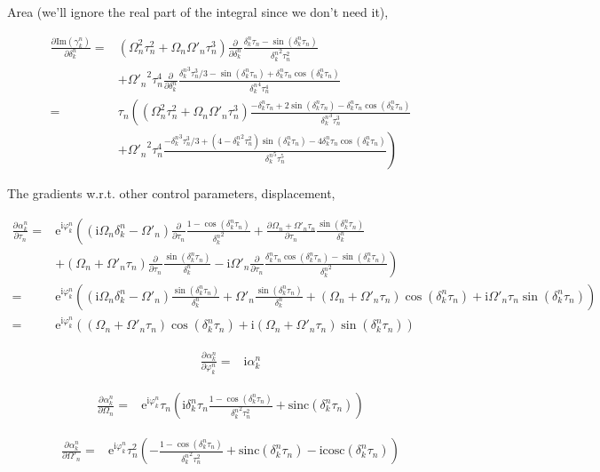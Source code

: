 \documentclass[10pt,fleqn]{article}
\newcommand{\ue}{\mathrm{e}}
\newcommand{\ui}{\mathrm{i}}
\newcommand{\eqar}[1]
{
  \begin{align*}
    #1
  \end{align*}
}
\newcommand{\paren}[1]{{\left({#1}\right)}}
\newcommand{\lparen}[1]{{\left({#1}\right.}}
\newcommand{\rparen}[1]{{\left.{#1}\right)}}
\newcommand{\pdiff}[3][{}]{{\frac{\partial^{#1} {#2}}{\partial {#3}{}^{#1}}}}
\begin{document}
Area (we'll ignore the real part of the integral since we don't need it),
\eqar{
  \pdiff{\mathrm{Im}\paren{\gamma_k^n}}{\delta_k^n}=&
  \paren{\Omega_n^2\tau_n^2+\Omega_n\Omega'_n\tau_n^3}\pdiff{}{\delta_k^n}\frac{\delta_k^n\tau_n-\sin\paren{{\delta_k^n}\tau_n}}{{\delta_k^n}^2\tau_n^2}\\
  &+{\Omega'_n}^2\tau_n^4\pdiff{}{\delta_k^n}\frac{
    {\delta_k^n}^3\tau_n^3/3
    -\sin\paren{{\delta_k^n}\tau_n}
    +{\delta_k^n}\tau_n\cos\paren{{\delta_k^n}\tau_n}
  }{{\delta_k^n}^4\tau_n^4}\\
  =&\tau_n\lparen{
    \paren{\Omega_n^2\tau_n^2+\Omega_n\Omega'_n\tau_n^3}
    \frac{-\delta_k^n\tau_n+2\sin\paren{{\delta_k^n}\tau_n}-{\delta_k^n}\tau_n\cos\paren{{\delta_k^n}\tau_n}}{{\delta_k^n}^3\tau_n^3}
  }\\
  &\rparen{+{\Omega'_n}^2\tau_n^4\frac{
      -{\delta_k^n}^3\tau_n^3/3
      +\paren{4-{\delta_k^n}^2\tau_n^2}\sin\paren{{\delta_k^n}\tau_n}
      -4{\delta_k^n}\tau_n\cos\paren{{\delta_k^n}\tau_n}
    }{{\delta_k^n}^5\tau_n^5}
  }
}

The gradients w.r.t. other control parameters, displacement,
\eqar{
  \pdiff{\alpha_k^n}{\tau_n}=&\ue^{\ui\varphi_k^n}\lparen{
    \paren{\ui\Omega_n\delta_k^n-\Omega'_n}\pdiff{}{\tau_n}\frac{1-\cos\paren{\delta_k^n\tau_n}}{{\delta_k^n}^2}
    +\pdiff{\Omega_n+\Omega'_n\tau_n}{\tau_n}
    \frac{\sin\paren{\delta_k^n\tau_n}}{\delta_k^n}
  }\\
  &\rparen{
    +\paren{\Omega_n+\Omega'_n\tau_n}
    \pdiff{}{\tau_n}\frac{\sin\paren{\delta_k^n\tau_n}}{\delta_k^n}
    -\ui\Omega'_n
    \pdiff{}{\tau_n}\frac{\delta_k^n\tau_n\cos\paren{\delta_k^n\tau_n}-\sin\paren{\delta_k^n\tau_n}}{{\delta_k^n}^2}
  }\\
  =&\ue^{\ui\varphi_k^n}\paren{
    \paren{\ui\Omega_n\delta_k^n-\Omega'_n}\frac{\sin\paren{\delta_k^n\tau_n}}{{\delta_k^n}}
    +\Omega'_n\frac{\sin\paren{\delta_k^n\tau_n}}{\delta_k^n}+\paren{\Omega_n+\Omega'_n\tau_n}
    \cos\paren{\delta_k^n\tau_n}
    +\ui\Omega'_n\tau_n\sin\paren{\delta_k^n\tau_n}
  }\\
  =&\ue^{\ui\varphi_k^n}\paren{
    \paren{\Omega_n+\Omega'_n\tau_n}\cos\paren{\delta_k^n\tau_n}
    +\ui\paren{\Omega_n+\Omega'_n\tau_n}\sin\paren{\delta_k^n\tau_n}
  }
}
\eqar{
  \pdiff{\alpha_k^n}{\varphi_k^n}=&\ui\alpha_k^n
}
\eqar{
  \pdiff{\alpha_k^n}{\Omega_n}=&\ue^{\ui\varphi_k^n}\tau_n\paren{
    \ui\delta_k^n\tau_n\frac{1-\cos\paren{\delta_k^n\tau_n}}{{\delta_k^n}^2\tau_n^2}
    +\mathrm{sinc}\paren{\delta_k^n\tau_n}
  }
}
\eqar{
  \pdiff{\alpha_k^n}{\Omega'_n}=&\ue^{\ui\varphi_k^n}\tau_n^2\paren{
    -\frac{1-\cos\paren{\delta_k^n\tau_n}}{{\delta_k^n}^2\tau_n^2}
    +\mathrm{sinc}\paren{\delta_k^n\tau_n}
    -\ui\mathrm{cosc}\paren{\delta_k^n\tau_n}
  }
}
\end{document}
